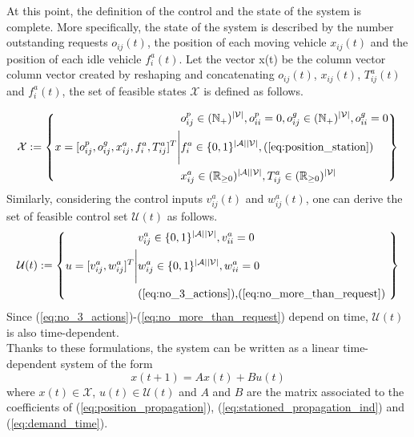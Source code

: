 At this point, the definition of the control and the state of the system is complete. More specifically, the state of the system is described by the number outstanding requests $o_{ij}(t)$, the position of each moving vehicle $x_{ij}(t)$ and the position of each idle vehicle $f^a_{i}(t)$. Let the vector x(t) be the column vector column vector created by reshaping and concatenating $o_{ij}(t)$, $x_{ij}(t)$, $T_{ij}^a(t)$ and $f^a_{i}(t)$, the set of feasible states $\mathcal{X}$ is defined as follows. 

\begin{equation}
	\mathcal{X} := \left\{
	\begin{aligned}
		& o^p_{ij} \in (\mathbb{N}_+)^{|\mathcal{V}|},o^p_{ii} = 0, o^g_{ij} \in (\mathbb{N}_+)^{|\mathcal{V}|},o^g_{ii} = 0   \\
		 x = [o^p_{ij},o^g_{ij}, x_{ij}^a, f^a_{i}, T_{ij}^a]^T \Bigg| &f^a_{i} \in \{0,1\}^{|\mathcal{A}||\mathcal{V}|}, \text{(\ref{eq:position_station})} \\
		&  x_{ij}^a\in (\mathbb{R}_{\ge 0})^{|\mathcal{A}||\mathcal{V}|}, T^a_{ij} \in (\mathbb{R}_{\ge 0})^{|\mathcal{V}|} \\
	\end{aligned}
	\right\}
\end{equation}
Similarly, considering the control inputs $v^{a}_{ij}(t)$ and $w^{a}_{ij}(t)$, one can derive the set of feasible control set $\mathcal{U}(t)$ as follows. 
\begin{equation}
	\mathcal{\mathcal{U}}(t) := \left\{
	\begin{aligned}
		&v^a_{ij} \in \{0,1\}^{|\mathcal{A}||\mathcal{V}|}, v^a_{ii} = 0 \\
		u = [v^{a}_{ij}, w^{a}_{ij}]^T \Bigg|&w^a_{ij} \in \{0,1\}^{|\mathcal{A}||\mathcal{V}|},w^a_{ii} = 0 \\ 
		&\text{(\ref{eq:no_3_actions}),(\ref{eq:no_more_than_request})
		} \\
	\end{aligned}
	\right\}
\end{equation}
Since (\ref{eq:no_3_actions})-(\ref{eq:no_more_than_request}) depend on time, $\mathcal{U}(t)$ is also time-dependent. \\
Thanks to these formulations, the system can be written as a linear time-dependent system of the form
\begin{equation}
	x(t+1) = Ax(t) + Bu(t)\label{eq:normal_system}
\end{equation}
where $x(t) \in \mathcal{X}$, $u(t) \in \mathcal{U}(t)$ and $A$ and $B$ are the matrix associated to the coefficients of (\ref{eq:position_propagation}), (\ref{eq:stationed_propagation_ind}) and (\ref{eq:demand_time}). \\


